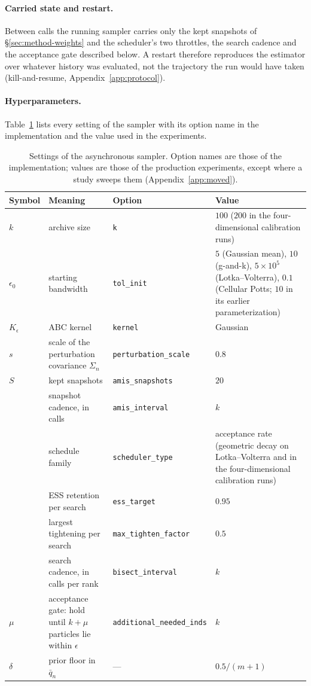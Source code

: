 \documentclass[10pt]{article}
\theoremstyle{plain}
\theoremstyle{definition}
\begin{document}
\paragraph{Carried state and restart.} Between calls the running sampler carries only the kept snapshots of \S\ref{sec:method-weights} and the scheduler's two throttles, the search cadence and the acceptance gate described below. A restart therefore reproduces the estimator over whatever history was evaluated, not the trajectory the run would have taken (kill-and-resume, Appendix~\ref{app:protocol}).

\paragraph{Hyperparameters.} Table~\ref{tab:hyperparameters} lists every setting of the sampler with its option name in the implementation and the value used in the experiments.
\begin{table}[h]
\caption{Settings of the asynchronous sampler. Option names are those of the implementation; values are those of the production experiments, except where a study sweeps them (Appendix~\ref{app:moved}).}\label{tab:hyperparameters}
\centering
\footnotesize
\begin{tabular}{@{}>{\raggedright\arraybackslash}p{}>{\raggedright\arraybackslash}p{}>{\raggedright\arraybackslash}p{}>{\raggedright\arraybackslash}p{}@{}}
\toprule
Symbol & Meaning & Option & Value \\
\midrule
$k$ & archive size & \texttt{k} & $100$ ($200$ in the four-dimensional calibration runs) \\
$\epsilon_0$ & starting bandwidth & \texttt{tol\_init} & $5$ (Gaussian mean), $10$ (g-and-k), $5\times10^{5}$ (Lotka--Volterra), $0.1$ (Cellular Potts; $10$ in its earlier parameterization) \\
$K_\epsilon$ & ABC kernel & \texttt{kernel} & Gaussian \\
$s$ & scale of the perturbation covariance $\Sigma_n$ & \texttt{perturbation\_scale} & $0.8$ \\
$S$ & kept snapshots & \texttt{amis\_snapshots} & $20$ \\
 & snapshot cadence, in calls & \texttt{amis\_interval} & $k$ \\
 & schedule family & \texttt{scheduler\_type} & acceptance rate (geometric decay on Lotka--Volterra and in the four-dimensional calibration runs) \\
 & ESS retention per search & \texttt{ess\_target} & $0.95$ \\
 & largest tightening per search & \texttt{max\_tighten\_factor} & $0.5$ \\
 & search cadence, in calls per rank & \texttt{bisect\_interval} & $k$ \\
$\mu$ & acceptance gate: hold until $k+\mu$ particles lie within $\epsilon$ & \texttt{additional\_needed\_inds} & $k$ \\
$\delta$ & prior floor in $\bar q_n$ & --- & $0.5/(m{+}1)$ \\
\bottomrule
\end{tabular}
\end{table}
\end{document}
